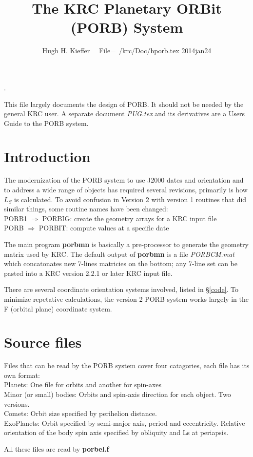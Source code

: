 \documentclass[draft]{article}
\title{The KRC Planetary ORBit (PORB) System}
\author{Hugh H. Kieffer  \ \ File=~/krc/Doc/hporb.tex 2014jan24}
\newcommand{\qi}{\\ \hspace*{2.em}}      %
\newcommand{\np}{\textbf}  %
\newcommand{\nf}{\textit}  %
\begin{document}
\maketitle
\tableofcontents
\hrulefill .\hrulefill

This file largely documents the design of PORB. It should not be needed by
the general KRC user. A separate document \nf{PUG.tex} and its derivatives are a
Users Guide to the PORB system.



\section{Introduction} The modernization of the PORB system to use J2000 dates and orientation and to address a wide range of objects has required several revisions, primarily is how $L_S$ is calculated. To avoid confusion in Version 2 with version 1 routines that did similar things, some routine names have been changed:
\qi PORB1 $\Rightarrow$ PORBIG: create the geometry arrays for a KRC input file 
\qi PORB $\Rightarrow$ PORBIT: compute values at a specific date 

The main program \np{porbmn} is basically a pre-processor to generate the
geometry matrix used by KRC. The default output of \np{porbmn} is a file
\nf{PORBCM.mat} which concatonates new 7-lines matricies on the bottom; any
7-line set can be pasted into a KRC version 2.2.1 or later KRC input file.

There are several coordinate orientation systems involved, listed in \S \ref{code}. To minimize repetative calculations, the version 2 PORB system works largely in the F (orbital plane) coordinate system. 

\section{Source files} %
Files that can be read by the PORB system cover four catagories, each file has its own format:
\qi Planets:  One file for orbits and another for spin-axes
\qi Minor (or small) bodies: Orbits and spin-axis direction for each object. Two versions.
\qi Comets: Orbit size specified by perihelion distance. 
\qi ExoPlanets: Orbit specified by semi-major axis, period and eccentricity. Relative orientation of the body spin axis specified by obliquity and Ls at periapsis.

All these files are read by \np{porbel.f} 
\end{document}
